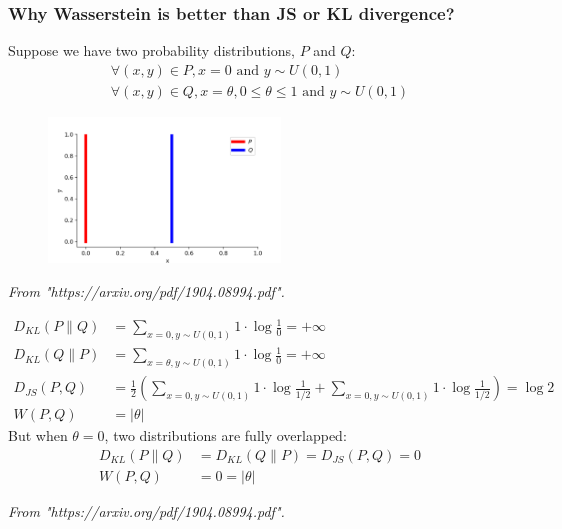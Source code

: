 \documentclass{tum-presentation}
\begin{document}
\begin{frame}
	\frametitle{Why Wasserstein is better than JS or KL divergence?}
	Suppose we have two probability distributions, $P$ and $Q$:
	\begin{equation}
		\begin{aligned}
			\forall (x, y) \in P, x = 0 \text{ and } y \sim U(0, 1) \\
			\forall (x, y) \in Q, x = \theta, 0 \leq \theta \leq 1 \text{ and } y \sim U(0, 1)
		\end{aligned}
	\end{equation}
	\begin{figure}
		\centering
		\includegraphics[width=0.55\textwidth,keepaspectratio=true]{tum-resources/images/wgan_3.png}
		\label{fig:wgan_3}
	\end{figure}
	\begin{flushright}
		\textit{From "https://arxiv.org/pdf/1904.08994.pdf".}
	\end{flushright}
\end{frame}

\begin{frame}
	\begin{equation}
		\begin{aligned}
			D_{KL}(P \| Q) &= \sum_{x=0, y \sim U(0, 1)} 1 \cdot \log\frac{1}{0} = +\infty \\
			D_{KL}(Q \| P) &= \sum_{x=\theta, y \sim U(0, 1)} 1 \cdot \log\frac{1}{0} = +\infty \\
			D_{JS}(P, Q) &= \frac{1}{2}(\sum_{x=0, y \sim U(0, 1)} 1 \cdot \log\frac{1}{1/2} + \sum_{x=0, y \sim U(0, 1)} 1 \cdot \log\frac{1}{1/2}) = \log 2\\
			W(P, Q) &= |\theta|
		\end{aligned} %
	\end{equation}
	But when $\theta = 0$, two distributions are fully overlapped:
	\begin{equation}
		\begin{aligned}
		D_{KL}(P \| Q) &= D_{KL}(Q \| P) = D_{JS}(P, Q) = 0\\
		W(P, Q) &= 0 = \lvert \theta \rvert
		\end{aligned} %
	\end{equation}
	\begin{flushright}
		\textit{From "https://arxiv.org/pdf/1904.08994.pdf".}
	\end{flushright}
\end{frame}
\end{document}
